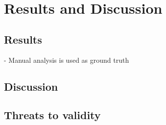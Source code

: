 \section{Results and Discussion}

\subsection{Results}
- Manual analysis is used as ground truth

\subsection{Discussion}

\subsection{Threats to validity}

